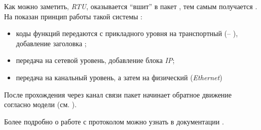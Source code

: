 \documentclass[../AISTR.tex]{subfiles}
\begin{document}
Как можно заметить, \mb \textit{RTU}, оказывается ``вшит'' в пакет \tcp, тем самым получается \mb \tcp. На  показан принцип работы такой системы \cite{__2010}:
\begin{itemize}
	\item коды функций передаются с прикладного уровня на транспортный (\mb -- \tcp), добавление заголовка \tcp;
	\item передача на сетевой уровень, добавление блока \textit{IP};
	\item передача на канальный уровень, а затем на физический (\textit{Ethernet})
\end{itemize}
После прохождения через канал связи пакет начинает обратное движение согласно модели \osi (см. ). 



Более подробно о работе с протоколом \mb{} можно узнать в документации \cite{swales_open_1999}.
\end{document}
